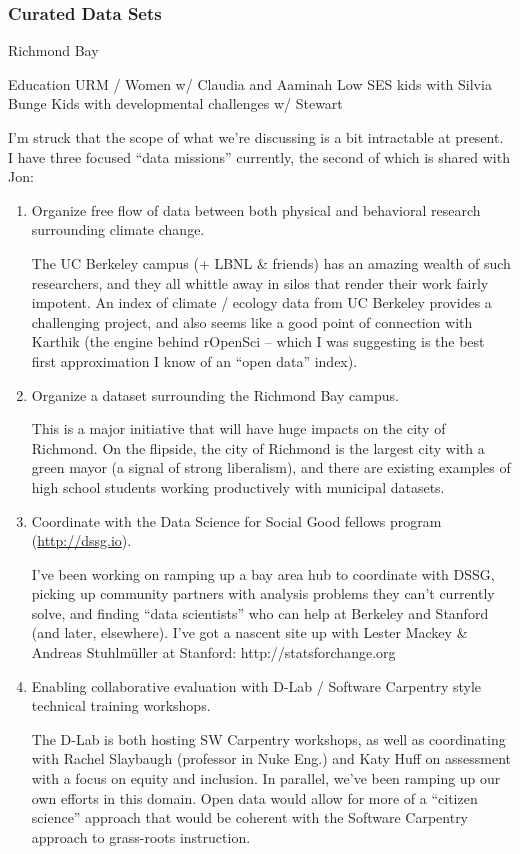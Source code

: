\subsubsection*{Curated Data Sets}

Richmond Bay

Education
URM / Women w/ Claudia and Aaminah
Low SES kids with Silvia Bunge
Kids with developmental challenges w/ Stewart

I'm struck that the scope of what we're discussing is a bit intractable at
present. I have three focused “data missions” currently, the second of which is
shared with Jon:

\begin{enumerate}
    \item Organize free flow of data between both physical and behavioral
        research surrounding climate change.

        The UC Berkeley campus (+ LBNL \& friends) has an amazing wealth of such
        researchers, and they all whittle away in silos that render their work
        fairly impotent. An index of climate / ecology data from UC Berkeley
        provides a challenging project, and also seems like a good point of
        connection with Karthik (the engine behind rOpenSci -- which I was
        suggesting is the best first approximation I know of an “open data”
        index).

    \item Organize a dataset surrounding the Richmond Bay campus.

        This is a major initiative that will have huge impacts on the city of
        Richmond.  On the flipside, the city of Richmond is the largest city
        with a green mayor (a signal of strong liberalism), and there are
        existing examples of high school students working productively with
        municipal datasets.

    \item Coordinate with the Data Science for Social Good fellows program
        (\url{http://dssg.io}).

        I've been working on ramping up a bay area hub to coordinate with DSSG,
        picking up community partners with analysis problems they can't
        currently solve, and finding “data scientists” who can help at Berkeley
        and Stanford (and later, elsewhere). I've got a nascent site up with
        Lester Mackey \& Andreas Stuhlmüller at Stanford:
        http://statsforchange.org

    \item Enabling collaborative evaluation with D-Lab / Software Carpentry style
        technical training workshops.

        The D-Lab is both hosting SW Carpentry workshops, as well as
        coordinating with Rachel Slaybaugh (professor in Nuke Eng.) and Katy
        Huff on assessment with a focus on equity and inclusion. In parallel,
        we've been ramping up our own efforts in this domain. Open data would
        allow for more of a “citizen science” approach that would be coherent
        with the Software Carpentry approach to grass-roots instruction.

\end{enumerate}


